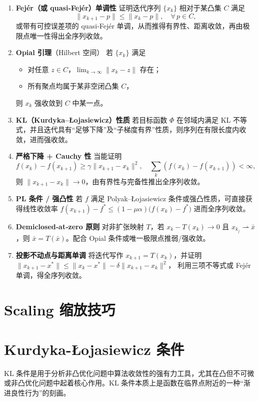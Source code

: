 \begin{enumerate}
	\item \textbf{Fejér（或 quasi‑Fejér）单调性}  
	证明迭代序列 $\{x_k\}$ 相对于某凸集 $C$ 满足
	\[
	\|x_{k+1}-p\|\le\|x_k-p\|,\quad\forall\,p\in C,
	\]
	或带有可控误差项的 quasi‑Fejér 单调，从而推得有界性、距离收敛，再由极限点唯一性得出全序列收敛。
	
	\item \textbf{Opial 引理}（Hilbert 空间）  
	若 $\{x_k\}$ 满足
	\begin{itemize}
		\item 对任意 $z\in C$，$\lim_{k\to\infty}\|x_k-z\|$ 存在；
		\item 所有聚点均属于某非空闭凸集 $C$，
	\end{itemize}
	则 $x_k$ 强收敛到 $C$ 中某一点。
	
	\item \textbf{KL（Kurdyka--Łojasiewicz）性质}  
	若目标函数 $\Phi$ 在邻域内满足 KL 不等式，并且迭代具有“足够下降”及“子梯度有界”性质，则序列在有限长度内收敛，进而强收敛。
	
	\item \textbf{严格下降 + Cauchy 性}  
	当能证明
	\[
	f(x_k)-f(x_{k+1})\ge \gamma\|x_{k+1}-x_k\|^2,
	\quad\sum_{k}(f(x_k)-f(x_{k+1}))<\infty,
	\]
	则 $\|x_{k+1}-x_k\|\to0$，由有界性与完备性推出全序列收敛。
	
	\item \textbf{PL 条件 / 强凸性}  
	若 $f$ 满足 Polyak–Łojasiewicz 条件或强凸性质，可直接获得线性收敛率
	\(
	f(x_{k+1})-f^*\le(1-\mu\alpha)\bigl(f(x_k)-f^*\bigr)
	\)
	进而全序列收敛。
	
	\item \textbf{Demiclosed‑at‑zero 原则}  
	对非扩张映射 $T$，若 $x_k-T(x_k)\to0$ 且 $x_{k_j}\rightharpoonup\bar x$，则 $\bar x=T(\bar x)$。配合 Opial 条件或唯一极限点推弱/强收敛。
	
	\item \textbf{投影不动点与距离单调}  
	将迭代写作 $x_{k+1}=T(x_k)$，并证明
	\(
	\|x_{k+1}-x^*\|\le\|x_k-x^*\|-\delta\|x_{k+1}-x_k\|^2
	\)，
	利用三项不等式或 Fejér 单调，得全序列收敛。
\end{enumerate}
\newpage
\section{Scaling 缩放技巧}
\newpage
\section{Kurdyka-Łojasiewicz 条件}
KL 条件是用于分析非凸优化问题中算法收敛性的强有力工具，尤其在凸但不可微或非凸优化问题中起着核心作用。KL 条件本质上是函数在临界点附近的一种“渐进良性行为”的刻画。

